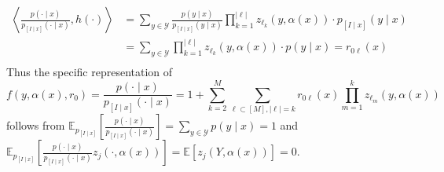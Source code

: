 \documentclass[11pt]{article}
\begin{document}
$$\begin{array}{rl} 
\displaystyle\left\langle \frac{p(\cdot\mid x)}{p_{[I\mid x]}(\cdot\mid x)}, h(\cdot)\right\rangle &\displaystyle = \sum_{y\in\mathcal{Y}} \frac{p(y\mid x)}{p_{[I\mid x]}(y\mid x)}\prod_{k=1}^{|\ell|}z_{\ell_k}(y,\alpha(x)) \cdot p_{[I\mid x]}(y\mid x) \\
&\displaystyle = \sum_{y\in\mathcal{Y}} \prod_{k=1}^{|\ell|}z_{\ell_k}(y,\alpha(x)) \cdot p(y\mid x) = r_{0\ell}(x)\\
\end{array}$$
Thus the specific representation of 
$$f(y,\alpha(x),r_0) = \frac{p(\cdot\mid x)}{p_{[I\mid x]}(\cdot\mid x)} = 1 + \sum_{k=2}^M \sum_{\ell \subset [M], |\ell|=k} r_{0\ell}(x) \prod_{m=1}^k z_{\ell_m}(y,\alpha(x))$$  
follows from $\mathbb{E}_{p_{[I\mid x]}}\left[\frac{p(\cdot\mid x)}{p_{[I\mid x]}(\cdot\mid x)}\right]=\sum_{y\in\mathcal{Y}}p(y\mid x) = 1$ and $\mathbb{E}_{p_{[I\mid x]}}\left[\frac{p(\cdot \mid x)}{p_{[I\mid x]}(\cdot\mid x)}z_j(\cdot,\alpha(x))\right]=\mathbb{E}[z_j(Y,\alpha(x))]=0$.
\end{document}
